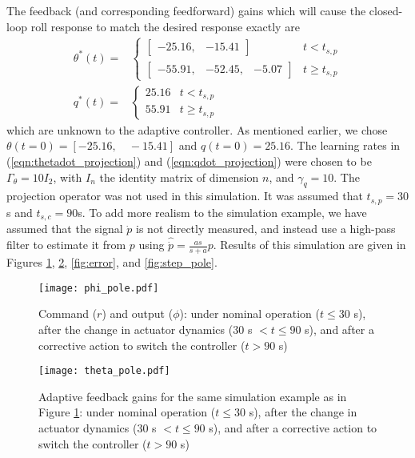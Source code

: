 The feedback (and corresponding feedforward) gains which will cause the closed-loop roll response to match the desired response exactly are
\begin{align}
	\theta^*(t) = & \begin{cases}
		\begin{bmatrix}
			-25.16, & -15.41
		\end{bmatrix}  & t < t_{s,p} \\
		\begin{bmatrix}
			-55.91, & -52.45, & -5.07
		\end{bmatrix} & t \geq t_{s,p}
	\end{cases} \\
	q^*(t) = & \begin{cases}
		25.16 & t < t_{s,p} \\
		55.91 & t \geq t_{s,p}
	\end{cases}
\end{align}
\noindent which are unknown to the adaptive controller. As mentioned earlier, we chose $\theta(t=0)= [-25.16, \quad -15.41]$ and $q(t=0)=25.16$. The learning rates in (\ref{eqn:thetadot_projection}) and (\ref{eqn:qdot_projection}) were chosen to be $\Gamma_\theta = 10 I_2$, with $I_n$ the identity matrix of dimension $n$, and $\gamma_q = 10$. The projection operator was not used in this simulation. It was assumed that $t_{s,p}=30$s and $t_{s,c}=90$s. To add more realism to the simulation example, we have assumed that the signal $\dot{p}$ is not directly measured, and instead use a high-pass filter to estimate it from $p$ using $\hat{\dot{p}} = \frac{as}{s+a} p$. Results of this simulation are given in Figures \ref{fig:command_and_output}, \ref{fig:theta}, \ref{fig:error}, and \ref{fig:step_pole}. 

\begin{figure}[h!]
	\centering
	\texttt{[image: phi\_pole.pdf]}
	\caption{Command ($r$) and output ($\phi$): under nominal operation ($t \leq 30$ s), after the change in actuator dynamics ($30$ s $< t \leq 90$ s), and after a corrective action to switch the controller ($t > 90$ s)}
	\label{fig:command_and_output}
\end{figure}

\begin{figure}[h!]
	\centering
	\texttt{[image: theta\_pole.pdf]}
	\caption{Adaptive feedback gains for the same simulation example as in Figure \ref{fig:command_and_output}: under nominal operation ($t \leq 30$ s), after the change in actuator dynamics ($30$ s $< t \leq 90$ s), and after a corrective action to switch the controller ($t > 90$ s)}
	\label{fig:theta}
\end{figure}

